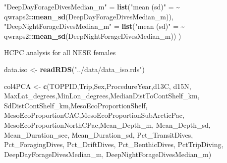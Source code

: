 \documentclass[
]{article}
\newenvironment{Shaded}{\begin{snugshade}}{\end{snugshade}}
\newcommand{\ErrorTok}[1]{\textcolor[rgb]{0.64,0.00,0.00}{\textbf{#1}}}
\newcommand{\FunctionTok}[1]{\textcolor[rgb]{0.13,0.29,0.53}{\textbf{#1}}}
\newcommand{\NormalTok}[1]{#1}
\newcommand{\OtherTok}[1]{\textcolor[rgb]{0.56,0.35,0.01}{#1}}
\newcommand{\SpecialCharTok}[1]{\textcolor[rgb]{0.81,0.36,0.00}{\textbf{#1}}}
\newcommand{\StringTok}[1]{\textcolor[rgb]{0.31,0.60,0.02}{#1}}
\begin{document}
\begin{Shaded}
\begin{Highlighting}[]
       \StringTok{"DeepDayForageDivesMedian\_m"} \OtherTok{=} \FunctionTok{list}\NormalTok{(}\StringTok{"mean (sd)"} \OtherTok{=} \ErrorTok{\textasciitilde{}}\NormalTok{ qwraps2}\SpecialCharTok{::}\FunctionTok{mean\_sd}\NormalTok{(DeepDayForageDivesMedian\_m)),}
       \StringTok{"DeepNightForageDivesMedian\_m"} \OtherTok{=} \FunctionTok{list}\NormalTok{(}\StringTok{"mean (sd)"} \OtherTok{=} \ErrorTok{\textasciitilde{}}\NormalTok{ qwraps2}\SpecialCharTok{::}\FunctionTok{mean\_sd}\NormalTok{(DeepNightForageDivesMedian\_m))}
\NormalTok{  )}
\end{Highlighting}
\end{Shaded}

HCPC analysis for all NESE females

\begin{Shaded}
\begin{Highlighting}[]
\NormalTok{data.iso }\OtherTok{\textless{}{-}} \FunctionTok{readRDS}\NormalTok{(}\StringTok{"../data/data\_iso.rds"}\NormalTok{)}

\NormalTok{col4PCA }\OtherTok{\textless{}{-}} \FunctionTok{c}\NormalTok{(}\StringTok{\textquotesingle{}TOPPID\textquotesingle{}}\NormalTok{,}\StringTok{\textquotesingle{}Trip\textquotesingle{}}\NormalTok{,}\StringTok{\textquotesingle{}Sex\textquotesingle{}}\NormalTok{,}\StringTok{\textquotesingle{}ProcedureYear\textquotesingle{}}\NormalTok{,}\StringTok{\textquotesingle{}d13C\textquotesingle{}}\NormalTok{,  }\StringTok{\textquotesingle{}d15N\textquotesingle{}}\NormalTok{, }
             \StringTok{\textquotesingle{}MaxLat\_degrees\textquotesingle{}}\NormalTok{,}\StringTok{\textquotesingle{}MinLon\_degrees\textquotesingle{}}\NormalTok{,}\StringTok{\textquotesingle{}MedianDistToContShelf\_km\textquotesingle{}}\NormalTok{,  }
             \StringTok{\textquotesingle{}SdDistContShelf\_km\textquotesingle{}}\NormalTok{,}\StringTok{\textquotesingle{}MesoEcoProportionShelf\textquotesingle{}}\NormalTok{, }
             \StringTok{\textquotesingle{}MesoEcoProportionCAC\textquotesingle{}}\NormalTok{,}\StringTok{\textquotesingle{}MesoEcoProportionSubArcticPac\textquotesingle{}}\NormalTok{,    }
             \StringTok{\textquotesingle{}MesoEcoProportionNorthCPac\textquotesingle{}}\NormalTok{,}\StringTok{\textquotesingle{}Mean\_Depth\_m\textquotesingle{}}\NormalTok{, }\StringTok{\textquotesingle{}Mean\_Depth\_sd\textquotesingle{}}\NormalTok{,}
             \StringTok{\textquotesingle{}Mean\_Duration\_sec\textquotesingle{}}\NormalTok{, }\StringTok{\textquotesingle{}Mean\_Duration\_sd\textquotesingle{}}\NormalTok{, }\StringTok{\textquotesingle{}Pct\_TransitDives\textquotesingle{}}\NormalTok{, }
             \StringTok{\textquotesingle{}Pct\_ForagingDives\textquotesingle{}}\NormalTok{, }\StringTok{\textquotesingle{}Pct\_DriftDives\textquotesingle{}}\NormalTok{, }\StringTok{\textquotesingle{}Pct\_BenthicDives\textquotesingle{}}\NormalTok{, }
             \StringTok{\textquotesingle{}PctTripDiving\textquotesingle{}}\NormalTok{, }\StringTok{\textquotesingle{}DeepDayForageDivesMedian\_m\textquotesingle{}}\NormalTok{, }
             \StringTok{\textquotesingle{}DeepNightForageDivesMedian\_m\textquotesingle{}}\NormalTok{) }



\end{Highlighting}
\end{Shaded}
\end{document}

